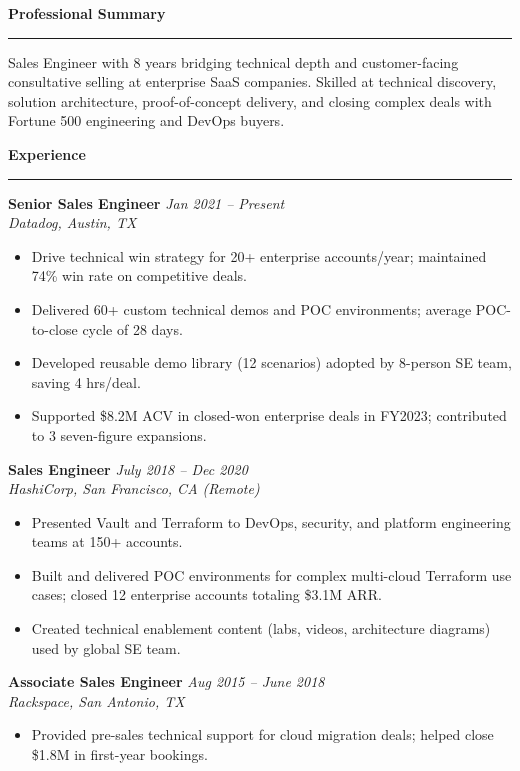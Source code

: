 \documentclass[11pt,a4paper]{article}
\newcommand{\rightsection}[1]{%
  \vspace{6pt}\noindent\textbf{\large #1}\vspace{1pt}\\
  \noindent\rule{\linewidth}{0.4pt}\vspace{3pt}%
}
\begin{document}
\begin{minipage}[t]{0.63\textwidth}

\rightsection{Professional Summary}
\small Sales Engineer with 8 years bridging technical depth and customer-facing consultative selling at enterprise SaaS companies. Skilled at technical discovery, solution architecture, proof-of-concept delivery, and closing complex deals with Fortune 500 engineering and DevOps buyers.

\rightsection{Experience}

\noindent\textbf{\small Senior Sales Engineer} \hfill \textit{\small Jan 2021 -- Present}\\
\textit{\small Datadog, Austin, TX}
\begin{itemize}\small
  \item Drive technical win strategy for 20+ enterprise accounts/year; maintained 74\% win rate on competitive deals.
  \item Delivered 60+ custom technical demos and POC environments; average POC-to-close cycle of 28 days.
  \item Developed reusable demo library (12 scenarios) adopted by 8-person SE team, saving 4 hrs/deal.
  \item Supported \$8.2M ACV in closed-won enterprise deals in FY2023; contributed to 3 seven-figure expansions.
\end{itemize}

\vspace{4pt}
\noindent\textbf{\small Sales Engineer} \hfill \textit{\small July 2018 -- Dec 2020}\\
\textit{\small HashiCorp, San Francisco, CA (Remote)}
\begin{itemize}\small
  \item Presented Vault and Terraform to DevOps, security, and platform engineering teams at 150+ accounts.
  \item Built and delivered POC environments for complex multi-cloud Terraform use cases; closed 12 enterprise accounts totaling \$3.1M ARR.
  \item Created technical enablement content (labs, videos, architecture diagrams) used by global SE team.
\end{itemize}

\vspace{4pt}
\noindent\textbf{\small Associate Sales Engineer} \hfill \textit{\small Aug 2015 -- June 2018}\\
\textit{\small Rackspace, San Antonio, TX}
\begin{itemize}\small
  \item Provided pre-sales technical support for cloud migration deals; helped close \$1.8M in first-year bookings.
\end{itemize}

\end{minipage}
\end{document}
